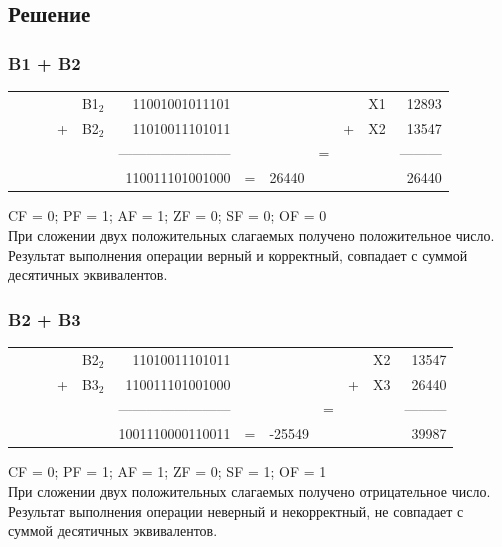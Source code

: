 \documentclass[11pt]{article}
\begin{document}
\subsection{Решение}
\label{sec:org9d9a981}
\subsubsection{B1 + B2}
\label{sec:org4f3d3ba}
\setlength{\tabcolsep}{3pt}
\label{tab:org5e24624}
\begin{tabular}{lllllrlllllr}
 &  &  &  & B1\(_{\text{2}}\) & 11001001011101 &  &  &  &  & X1 & 12893\\
 &  &  & + & B2\(_{\text{2}}\) & 11010011101011 &  &  &  & + & X2 & 13547\\
 &  &  &  &  & ------------------------ &  &  & = &  &  & ---------\\
 &  &  &  &  & 110011101001000 & = & 26440 &  &  &  & 26440\\
\end{tabular}

CF = 0; PF = 1; AF = 1; ZF = 0; SF = 0; OF = 0\\
При сложении двух положительных слагаемых получено положительное число. Результат выполнения операции верный и корректный, совпадает с суммой десятичных эквивалентов.

\subsubsection{B2 + B3}
\label{sec:org33f1565}
\setlength{\tabcolsep}{3pt}
\label{tab:org7d4ee9f}
\begin{tabular}{lllllrlllllr}
 &  &  &  & B2\(_{\text{2}}\) & 11010011101011 &  &  &  &  & X2 & 13547\\
 &  &  & + & B3\(_{\text{2}}\) & 110011101001000 &  &  &  & + & X3 & 26440\\
 &  &  &  &  & ------------------------ &  &  & = &  &  & ---------\\
 &  &  &  &  & 1001110000110011 & = & -25549 &  &  &  & 39987\\
\end{tabular}

CF = 0; PF = 1; AF = 1; ZF = 0; SF = 1; OF = 1\\
При сложении двух положительных слагаемых получено отрицательное число. Результат выполнения операции неверный и некорректный, не совпадает с суммой десятичных эквивалентов.
\end{document}
